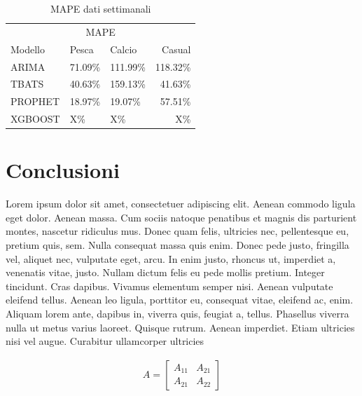 \documentclass[12pt, a4paper, twocolumn]{article} %
\begin{document}
		\begin{table}[H]
			\caption{MAPE dati settimanali}
			\centering
				\begin{tabular}{lllr}
					\toprule
					\multicolumn{4}{c}{MAPE} \\
					\cmidrule(r){2-4}
						Modello & Pesca & Calcio & Casual \\
					\midrule
						ARIMA & 71.09\% & 111.99\% & 118.32\% \\
						TBATS & 40.63\% & 159.13\% & 41.63\% \\
						PROPHET & 18.97\% & 19.07\% & 57.51\% \\
						XGBOOST & X\% & X\% & X\% \\
					\bottomrule
				\end{tabular}
			\end{table}


\section{Conclusioni}
Lorem ipsum dolor sit amet, consectetuer adipiscing elit. Aenean commodo ligula eget dolor. Aenean massa. Cum sociis natoque penatibus et magnis dis parturient montes, nascetur ridiculus mus. Donec quam felis, ultricies nec, pellentesque eu, pretium quis, sem. Nulla consequat massa quis enim. Donec pede justo, fringilla vel, aliquet nec, vulputate eget, arcu. In enim justo, rhoncus ut, imperdiet a, venenatis vitae, justo. Nullam dictum felis eu pede mollis pretium. Integer tincidunt. Cras dapibus. Vivamus elementum semper nisi. Aenean vulputate eleifend tellus. Aenean leo ligula, porttitor eu, consequat vitae, eleifend ac, enim. Aliquam lorem ante, dapibus in, viverra quis, feugiat a, tellus. Phasellus viverra nulla ut metus varius laoreet. Quisque rutrum. Aenean imperdiet. Etiam ultricies nisi vel augue. Curabitur ullamcorper ultricies

\begin{align}
	A = 
	\begin{bmatrix}
	A_{11} & A_{21} \\
  	A_{21} & A_{22}
	\end{bmatrix}
\end{align}

\nocite{*} %
\printbibliography[title={Bibliografia}] %
\end{document}
